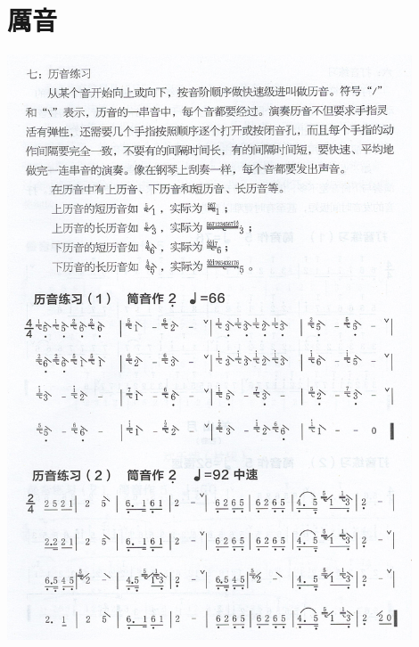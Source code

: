 \documentclass[cn,pad,twocol]{elegantbook}
\begin{document}
\section{厲音}
    \includegraphics[width=0.9\textwidth]{dongxiao/Scan 13.jpeg}
\end{document}
